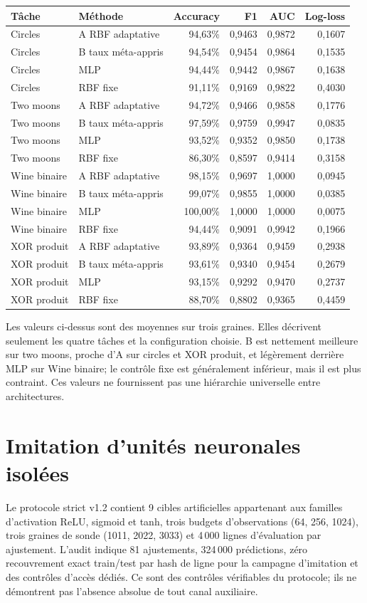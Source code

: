 \documentclass[11pt,a4paper,oneside]{report}
\begin{document}
\begin{longtable}{llrrrr}
\toprule
Tâche & Méthode & Accuracy & F1 & AUC & Log-loss\\
\midrule\endhead
Circles & A RBF adaptative & 94,63\% & 0,9463 & 0,9872 & 0,1607\\
Circles & B taux méta-appris & 94,54\% & 0,9454 & 0,9864 & 0,1535\\
Circles & MLP & 94,44\% & 0,9442 & 0,9867 & 0,1638\\
Circles & RBF fixe & 91,11\% & 0,9169 & 0,9822 & 0,4030\\
\midrule
Two moons & A RBF adaptative & 94,72\% & 0,9466 & 0,9858 & 0,1776\\
Two moons & B taux méta-appris & 97,59\% & 0,9759 & 0,9947 & 0,0835\\
Two moons & MLP & 93,52\% & 0,9352 & 0,9850 & 0,1738\\
Two moons & RBF fixe & 86,30\% & 0,8597 & 0,9414 & 0,3158\\
\midrule
Wine binaire & A RBF adaptative & 98,15\% & 0,9697 & 1,0000 & 0,0945\\
Wine binaire & B taux méta-appris & 99,07\% & 0,9855 & 1,0000 & 0,0385\\
Wine binaire & MLP & 100,00\% & 1,0000 & 1,0000 & 0,0075\\
Wine binaire & RBF fixe & 94,44\% & 0,9091 & 0,9942 & 0,1966\\
\midrule
XOR produit & A RBF adaptative & 93,89\% & 0,9364 & 0,9459 & 0,2938\\
XOR produit & B taux méta-appris & 93,61\% & 0,9340 & 0,9454 & 0,2679\\
XOR produit & MLP & 93,15\% & 0,9292 & 0,9470 & 0,2737\\
XOR produit & RBF fixe & 88,70\% & 0,8802 & 0,9365 & 0,4459\\
\bottomrule
\end{longtable}
Les valeurs ci-dessus sont des moyennes sur trois graines. Elles décrivent seulement les quatre tâches et la configuration choisie. B est nettement meilleure sur two moons, proche d'A sur circles et XOR produit, et légèrement derrière MLP sur Wine binaire; le contrôle fixe est généralement inférieur, mais il est plus contraint. Ces valeurs ne fournissent pas une hiérarchie universelle entre architectures.

\section{Imitation d'unités neuronales isolées}
Le protocole strict v1.2 contient 9 cibles artificielles appartenant aux familles d'activation ReLU, sigmoid et tanh, trois budgets d'observations (64, 256, 1024), trois graines de sonde (1011, 2022, 3033) et 4\,000 lignes d'évaluation par ajustement. L'audit indique 81 ajustements, 324\,000 prédictions, zéro recouvrement exact train/test par hash de ligne pour la campagne d'imitation et des contrôles d'accès dédiés. Ce sont des contrôles vérifiables du protocole; ils ne démontrent pas l'absence absolue de tout canal auxiliaire.
\end{document}
